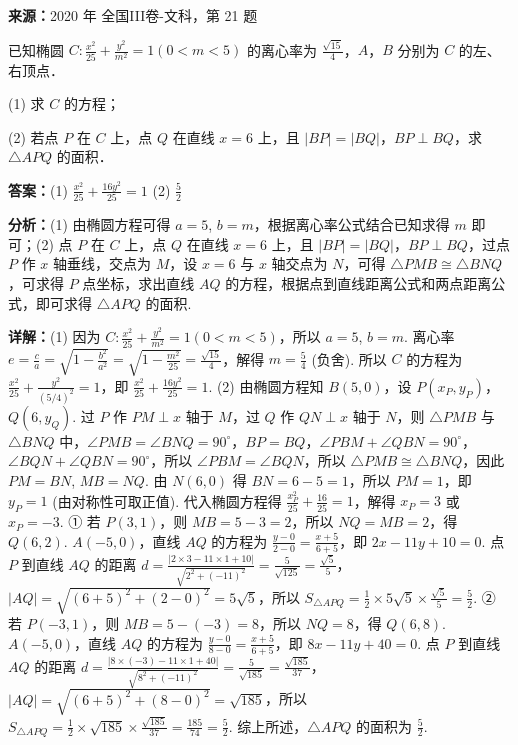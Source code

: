 \begin{question}[points=12]
\textbf{来源：}2020 年 全国III卷-文科，第 21 题\par
已知椭圆 $C:\frac{x^2}{25}+\frac{y^2}{m^2}=1(0<m<5)$ 的离心率为 $\frac{\sqrt{15}}{4}$，$A$，$B$ 分别为 $C$ 的左、右顶点．

(1) 求 $C$ 的方程；

(2) 若点 $P$ 在 $C$ 上，点 $Q$ 在直线 $x=6$ 上，且 $|BP|=|BQ|$，$BP\perp BQ$，求 $\triangle APQ$ 的面积．
\begin{solution}
\textbf{答案：}(1) $\frac{x^2}{25}+\frac{16y^2}{25}=1$ (2) $\frac{5}{2}$

\textbf{分析：}(1) 由椭圆方程可得 $a=5$, $b=m$，根据离心率公式结合已知求得 $m$ 即可；(2) 点 $P$ 在 $C$ 上，点 $Q$ 在直线 $x=6$ 上，且 $|BP|=|BQ|$，$BP\perp BQ$，过点 $P$ 作 $x$ 轴垂线，交点为 $M$，设 $x=6$ 与 $x$ 轴交点为 $N$，可得 $\triangle PMB\cong\triangle BNQ$，可求得 $P$ 点坐标，求出直线 $AQ$ 的方程，根据点到直线距离公式和两点距离公式，即可求得 $\triangle APQ$ 的面积.

\textbf{详解：}(1) 因为 $C:\frac{x^2}{25}+\frac{y^2}{m^2}=1(0<m<5)$，所以 $a=5$, $b=m$. 离心率 $e=\frac{c}{a}=\sqrt{1-\frac{b^2}{a^2}}=\sqrt{1-\frac{m^2}{25}}=\frac{\sqrt{15}}{4}$，解得 $m=\frac{5}{4}$ (负舍). 所以 $C$ 的方程为 $\frac{x^2}{25}+\frac{y^2}{(5/4)^2}=1$，即 $\frac{x^2}{25}+\frac{16y^2}{25}=1$.
(2) 由椭圆方程知 $B(5,0)$，设 $P(x_P,y_P)$，$Q(6,y_Q)$. 过 $P$ 作 $PM\perp x$ 轴于 $M$，过 $Q$ 作 $QN\perp x$ 轴于 $N$，则 $\triangle PMB$ 与 $\triangle BNQ$ 中，$\angle PMB=\angle BNQ=90^\circ$，$BP=BQ$，$\angle PBM+\angle QBN=90^\circ$，$\angle BQN+\angle QBN=90^\circ$，所以 $\angle PBM=\angle BQN$，所以 $\triangle PMB\cong\triangle BNQ$，因此 $PM=BN$, $MB=NQ$. 由 $N(6,0)$ 得 $BN=6-5=1$，所以 $PM=1$，即 $y_P=1$ (由对称性可取正值). 代入椭圆方程得 $\frac{x_P^2}{25}+\frac{16}{25}=1$，解得 $x_P=3$ 或 $x_P=-3$.
① 若 $P(3,1)$，则 $MB=5-3=2$，所以 $NQ=MB=2$，得 $Q(6,2)$. $A(-5,0)$，直线 $AQ$ 的方程为 $\frac{y-0}{2-0}=\frac{x+5}{6+5}$，即 $2x-11y+10=0$. 点 $P$ 到直线 $AQ$ 的距离 $d=\frac{|2\times3-11\times1+10|}{\sqrt{2^2+(-11)^2}}=\frac{5}{\sqrt{125}}=\frac{\sqrt{5}}{5}$，$|AQ|=\sqrt{(6+5)^2+(2-0)^2}=5\sqrt{5}$，所以 $S_{\triangle APQ}=\frac{1}{2}\times5\sqrt{5}\times\frac{\sqrt{5}}{5}=\frac{5}{2}$.
② 若 $P(-3,1)$，则 $MB=5-(-3)=8$，所以 $NQ=8$，得 $Q(6,8)$. $A(-5,0)$，直线 $AQ$ 的方程为 $\frac{y-0}{8-0}=\frac{x+5}{6+5}$，即 $8x-11y+40=0$. 点 $P$ 到直线 $AQ$ 的距离 $d=\frac{|8\times(-3)-11\times1+40|}{\sqrt{8^2+(-11)^2}}=\frac{5}{\sqrt{185}}=\frac{\sqrt{185}}{37}$，$|AQ|=\sqrt{(6+5)^2+(8-0)^2}=\sqrt{185}$，所以 $S_{\triangle APQ}=\frac{1}{2}\times\sqrt{185}\times\frac{\sqrt{185}}{37}=\frac{185}{74}=\frac{5}{2}$.
综上所述，$\triangle APQ$ 的面积为 $\frac{5}{2}$.
\end{solution}
\end{question}

